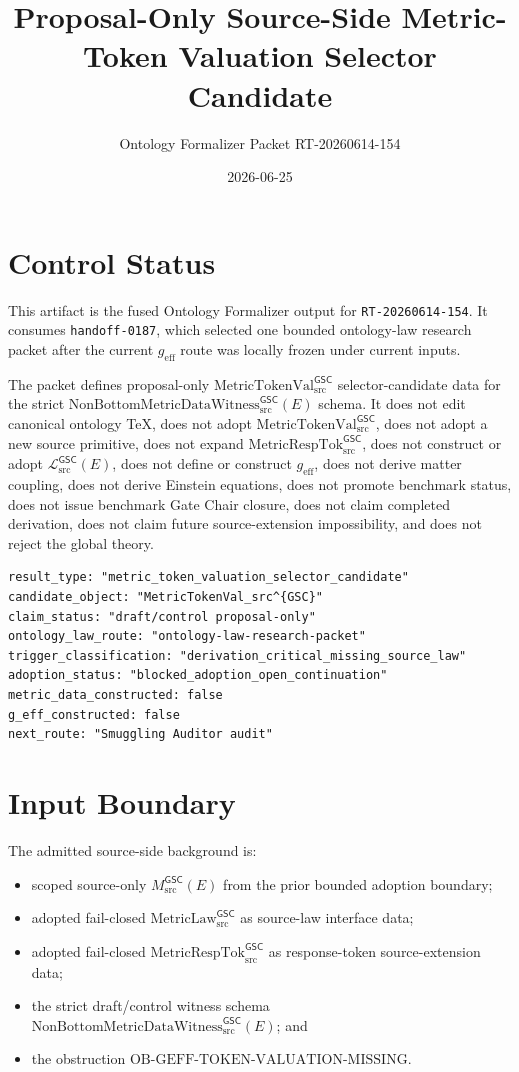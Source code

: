 \documentclass[11pt]{article}
\title{Proposal-Only Source-Side Metric-Token Valuation Selector Candidate}
\author{Ontology Formalizer Packet RT-20260614-154}
\date{2026-06-25}
\newcommand{\MsrcGSC}{M_{\mathrm{src}}^{\mathsf{GSC}}}
\newcommand{\MetricLaw}{\mathrm{MetricLaw}_{\mathrm{src}}^{\mathsf{GSC}}}
\newcommand{\MetricRespTok}{\mathrm{MetricRespTok}_{\mathrm{src}}^{\mathsf{GSC}}}
\newcommand{\MetricTokenVal}{\mathrm{MetricTokenVal}_{\mathrm{src}}^{\mathsf{GSC}}}
\newcommand{\Witness}{\mathrm{NonBottomMetricDataWitness}_{\mathrm{src}}^{\mathsf{GSC}}}
\newcommand{\MetricData}{\mathcal{L}_{\mathrm{src}}^{\mathsf{GSC}}}
\newcommand{\geff}{g_{\mathrm{eff}}}
\begin{document}
\maketitle

\section{Control Status}

This artifact is the fused Ontology Formalizer output for
\texttt{RT-20260614-154}. It consumes \texttt{handoff-0187}, which selected
one bounded ontology-law research packet after the current \(\geff\) route
was locally frozen under current inputs.

The packet defines proposal-only \(\MetricTokenVal\) selector-candidate data
for the strict \(\Witness(E)\) schema. It does not edit canonical ontology
TeX, does not adopt \(\MetricTokenVal\), does not adopt a new source
primitive, does not expand \(\MetricRespTok\), does not construct or adopt
\(\MetricData(E)\), does not define or construct \(\geff\), does not derive
matter coupling, does not derive Einstein equations, does not promote
benchmark status, does not issue benchmark Gate Chair closure, does not claim
completed derivation, does not claim future source-extension impossibility,
and does not reject the global theory.

\begin{verbatim}
result_type: "metric_token_valuation_selector_candidate"
candidate_object: "MetricTokenVal_src^{GSC}"
claim_status: "draft/control proposal-only"
ontology_law_route: "ontology-law-research-packet"
trigger_classification: "derivation_critical_missing_source_law"
adoption_status: "blocked_adoption_open_continuation"
metric_data_constructed: false
g_eff_constructed: false
next_route: "Smuggling Auditor audit"
\end{verbatim}

\section{Input Boundary}

The admitted source-side background is:
\begin{itemize}[leftmargin=*]
  \item scoped source-only \(\MsrcGSC(E)\) from the prior bounded adoption
  boundary;
  \item adopted fail-closed \(\MetricLaw\) as source-law interface data;
  \item adopted fail-closed \(\MetricRespTok\) as response-token
  source-extension data;
  \item the strict draft/control witness schema \(\Witness(E)\); and
  \item the obstruction
  \(\mathrm{OB\mbox{-}GEFF\mbox{-}TOKEN\mbox{-}VALUATION\mbox{-}MISSING}\).
\end{itemize}
\end{document}
